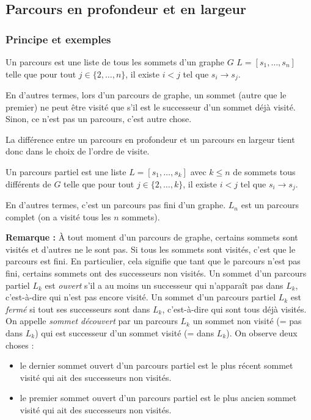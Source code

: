 \documentclass[../../../main.tex]{subfiles}
\begin{document}
\subsection{Parcours en profondeur et en largeur}
\subsubsection{Principe et exemples}
 {
	Un parcours est une liste de tous les sommets d'un graphe $G$ $L = [s_1, \dots, s_n]$ telle que pour tout $j\in\{2, \dots, n\}$, il existe $i < j$ tel que $s_i\rightarrow s_j$.\newline

	En d'autres termes, lors d'un parcours de graphe, un sommet (autre que le premier) ne peut être visité que s'il est le successeur d'un sommet déjà visité. Sinon, ce n'est pas un parcours, c'est autre chose.	
}
La différence entre un parcours en profondeur et un parcours en largeur tient donc dans le choix de l'ordre de visite.
 {
	Un parcours partiel est une liste $L = [s_1, \dots, s_k]$ avec $k \leq n$ de sommets tous différents de $G$ telle que pour tout $j\in\{2, \dots, k\}$, il existe $i < j$ tel que $s_i\rightarrow s_j$.\newline

	En d'autres termes, c'est un parcours pas fini d'un graphe. $L_n$ est un parcours complet (on a visité tous les $n$ sommets).
}
\textbf{Remarque :} À tout moment d'un parcours de graphe, certains sommets sont visités et d'autres ne le sont pas. Si tous les sommets sont visités, c'est que le parcours est fini. En particulier, cela signifie que tant que le parcours n'est pas fini, certains sommets ont des successeurs non visités.
 {
	Un sommet d'un parcours partiel $L_k$ est \textit{ouvert} s'il a au moins un successeur qui n'apparaît pas dans $L_k$, c'est-à-dire qui n'est pas encore visité.
}
 {
	Un sommet d'un parcours partiel $L_k$ est \textit{fermé} si tout ses successeurs sont dans $L_k$, c'est-à-dire qui sont tous déjà visités.
}
 {
	On appelle \textit{sommet découvert} par un parcours $L_k$ un sommet non visité (= pas dans $L_k$) qui est successeur d'un sommet visité (= dans $L_k$).
}
On observe deux choses :
\begin{itemize}
	\item le dernier sommet ouvert d'un parcours partiel est le plus récent sommet visité qui ait des successeurs non visités.
	\item le premier sommet ouvert d'un parcours partiel est le plus ancien sommet visité qui ait des successeurs non visités.
\end{itemize}
\end{document}
